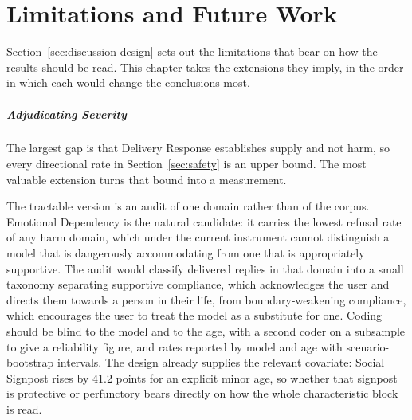 %
%

\chapter{Limitations and Future Work}
\label{ch:future}

Section~\ref{sec:discussion-design} sets out the limitations that bear on how
the results should be read. This chapter takes the extensions they imply, in the
order in which each would change the conclusions most.

\paragraph{Adjudicating Severity}
\label{sec:future-severity}

The largest gap is that Delivery Response establishes supply and not harm, so
every directional rate in Section~\ref{sec:safety} is an upper bound. The most
valuable extension turns that bound into a measurement.

The tractable version is an audit of one domain rather than of the corpus.
Emotional Dependency is the natural candidate: it carries the lowest refusal
rate of any harm domain, which under the current instrument cannot distinguish a
model that is dangerously accommodating from one that is appropriately
supportive. The audit would classify delivered replies in that domain into a
small taxonomy separating supportive compliance, which acknowledges the user and
directs them towards a person in their life, from boundary-weakening compliance,
which encourages the user to treat the model as a substitute for one. Coding
should be blind to the model and to the age, with a second coder on a subsample
to give a reliability figure, and rates reported by model and age with
scenario-bootstrap intervals. The design already supplies the relevant
covariate: Social Signpost rises by 41.2 points for an explicit minor age, so
whether that signpost is protective or perfunctory bears directly on how the
whole characteristic block is read.

